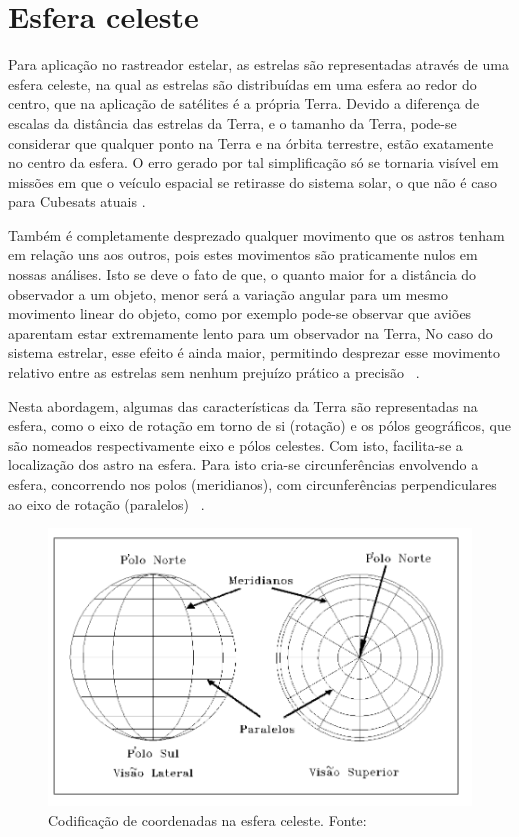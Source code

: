 \section{Esfera celeste}

Para aplicação no rastreador estelar, as estrelas são representadas através de uma esfera celeste, na  qual as estrelas são distribuídas em uma esfera ao redor do centro, que na aplicação de satélites é a própria Terra. 
Devido a diferença de escalas da distância das estrelas da Terra, e o tamanho da Terra, 
pode-se considerar que qualquer ponto na Terra e na órbita terrestre, estão exatamente no centro da esfera. 
O erro gerado por tal simplificação só se tornaria visível em missões em que o veículo espacial se retirasse do sistema solar, o que não é caso para Cubesats atuais \cite{Fialho}.

Também é completamente desprezado qualquer movimento que os astros tenham em relação uns aos outros, 
pois estes movimentos são praticamente nulos em nossas análises.
Isto se deve o fato de que, o quanto maior for a distância do observador a um objeto, 
menor será a variação angular para um mesmo movimento linear do objeto, 
como por exemplo pode-se observar que aviões aparentam estar extremamente lento para um observador na Terra, 
No caso do sistema estrelar, esse efeito é ainda maior, permitindo desprezar esse movimento relativo entre as estrelas sem nenhum prejuízo prático a precisão ~\cite[]{Carvalho}.

Nesta abordagem, algumas das características da Terra são representadas na esfera, como o eixo de rotação em torno de si (rotação) e os pólos geográficos, 
que são nomeados respectivamente eixo e pólos celestes. Com isto, facilita-se a localização dos astro na esfera. 
Para isto cria-se circunferências envolvendo a esfera, concorrendo nos polos (meridianos), 
com circunferências perpendiculares ao eixo de rotação (paralelos) ~\cite[]{Carvalho}.

\begin{figure}[H]
	\centering
	\includegraphics[width=.7\columnwidth]{images/codficacao_cod_esferas_celetes.png}
	\caption{Codificação de coordenadas na esfera celeste. Fonte: ~\cite[]{Carvalho}}
	\label{fig:codficacao_cod_esferas_celetes}
\end{figure}

